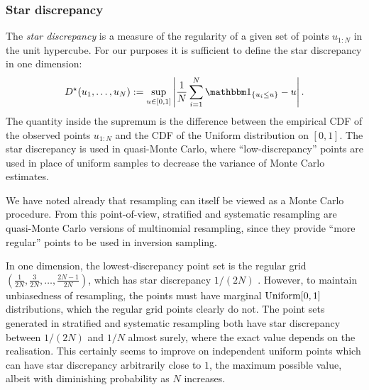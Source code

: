 \subsubsection{Star discrepancy \seb{$\checkmark$} }
%

The \emph{star discrepancy}\seb{[citation]} is a measure of the regularity of a given set of points $u_{1:N}$ in the unit hypercube. For our purposes it is sufficient to define the star discrepancy in one dimension:
\begin{equation*}
D^\star (u_1, \dots, u_N) := \sup_{u \in [0,1]} \left| \frac{1}{N} \sum_{i=1}^N \I{u_i \leq u} -u \right| .
\end{equation*}
The quantity inside the supremum is the difference between the empirical CDF of the observed points $u_{1:N}$ and the CDF of the Uniform distribution on $[0,1]$.
The star discrepancy is used in quasi-Monte Carlo, where ``low-discrepancy'' points are used in place of uniform samples to decrease the variance of Monte Carlo estimates.

We have noted already  that resampling can itself be viewed as a Monte Carlo procedure.
From this point-of-view, stratified and systematic resampling are quasi-Monte Carlo versions of multinomial resampling, since they provide ``more regular'' points to be used in inversion sampling.

In one dimension, the lowest-discrepancy point set is the regular grid $( \frac{1}{2N}, \frac{3}{2N}, \dots, \frac{2N-1}{2N} )$, which has star discrepancy $1/(2N)$ \seb{[citation]}.
However, to maintain unbiasedness of resampling, the points must have marginal $\operatorname{Uniform}[0,1]$ distributions, which the regular grid points clearly do not.
The point sets generated in stratified and systematic resampling both have star discrepancy between $1/(2N)$ and $1/N$ almost surely, where the exact value depends on the realisation.
This certainly seems to improve on independent uniform points which can have star discrepancy arbitrarily close to $1$, the maximum possible value, albeit with diminishing probability as $N$ increases.



